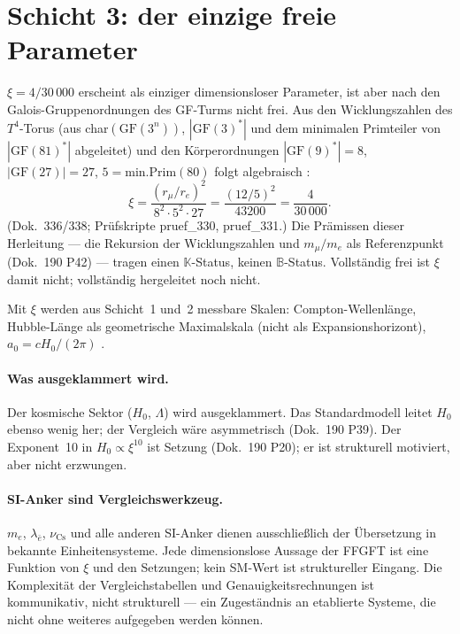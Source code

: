 \section{Schicht 3: der einzige freie Parameter}

$\xi = 4/30\,000$ erscheint als einziger dimensionsloser Parameter, ist aber
nach den Galois-Gruppenordnungen des GF-Turms nicht frei. Aus den Wicklungszahlen
des $T^4$-Torus (aus char$(\text{GF}(3^n))$, $|\text{GF}(3)^*|$ und dem
minimalen Primteiler von $|\text{GF}(81)^*|$ abgeleitet) und den Körperordnungen
$|\text{GF}(9)^*|=8$, $|\text{GF}(27)|=27$, $5=\text{min.Prim}(80)$ folgt
algebraisch \KM:
\[
  \xi = \frac{(r_\mu/r_e)^2}{8^2\cdot5^2\cdot27} = \frac{(12/5)^2}{43200} = \frac{4}{30\,000}.
\]
(Dok.~336/338; Prüfskripte pruef\_330, pruef\_331.) Die Prämissen dieser Herleitung
--- die Rekursion der Wicklungszahlen und $m_\mu/m_e$ als Referenzpunkt (Dok.~190 P42)
--- tragen einen $\mathbb{K}$-Status, keinen $\mathbb{B}$-Status. Vollständig frei
ist $\xi$ damit nicht; vollständig hergeleitet noch nicht.

Mit $\xi$ werden aus Schicht~1 und~2 messbare Skalen: Compton-Wellenlänge,
Hubble-Länge als geometrische Maximalskala (nicht als Expansionshorizont),
$a_0=cH_0/(2\pi)$ \KM.

\paragraph{Was ausgeklammert wird.}
Der kosmische Sektor ($H_0$, $\Lambda$) wird ausgeklammert. Das Standardmodell
leitet $H_0$ ebenso wenig her; der Vergleich wäre asymmetrisch (Dok.~190 P39).
Der Exponent~10 in $H_0\propto\xi^{10}$ ist Setzung (Dok.~190 P20); er ist
strukturell motiviert, aber nicht erzwungen.

\paragraph{SI-Anker sind Vergleichswerkzeug.}
$m_e$, $\lambda_{\bar e}$, $\nu_{\mathrm{Cs}}$ und alle anderen SI-Anker dienen
ausschließlich der Übersetzung in bekannte Einheitensysteme. Jede dimensionslose
Aussage der FFGFT ist eine Funktion von $\xi$ und den Setzungen; kein SM-Wert
ist struktureller Eingang. Die Komplexität der Vergleichstabellen und
Genauigkeitsrechnungen ist kommunikativ, nicht strukturell --- ein Zugeständnis
an etablierte Systeme, die nicht ohne weiteres aufgegeben werden können.

